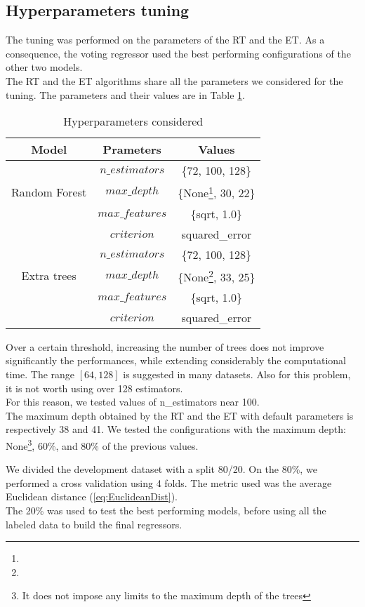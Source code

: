 \documentclass[conference]{IEEEtran}
\begin{document}
\subsection{Hyperparameters tuning}
The tuning was performed on the parameters of the RT and the ET. As a consequence, the voting regressor used the best performing configurations of the other two models. \\
The RT and the ET algorithms share all the parameters we considered for the tuning. The parameters and their values are in Table \ref{tab:tabHP}.
\begin{table}[h]
    \centering
    \caption{Hyperparameters considered}
    \label{tab:tabHP}
    \begin{tabular}{|c|c|c|}
        \hline
        \textbf{Model} & \textbf{Prameters} & \textbf{Values} \\
        \hline
        &$n\_estimators$&\{72, 100, 128\}\\
        Random Forest&$max\_depth$&\{None\footnote[1]{}, 30, 22\}\\
        &$max\_features$&\{sqrt, 1.0\}\\
        &$criterion$&squared\_error\\
        \hline
        &$n\_estimators$& \{72, 100, 128\} \\
        Extra trees&$max\_depth$&\{None\footnote[1]{}, 33, 25\}\\
        &$max\_features$&\{sqrt, 1.0\}\\
        &$criterion$&squared\_error\\
        \hline
    \end{tabular}
\end{table}

Over a certain threshold, increasing the number of trees does not improve significantly the performances, while extending considerably the computational time.  The range $[64, 128]$ is suggested in many datasets\cite{limitNumTrees}. Also for this problem, it is not worth using over 128 estimators. \\
For this reason, we tested values of n\_estimators near 100. \\

The maximum depth obtained by the RT and the ET with default parameters is respectively 38 and 41. We tested the configurations with the maximum depth: None\footnote[1]{It does not impose any limits to the maximum depth of the trees}, 60\%, and 80\% of the previous values. 

We divided the development dataset with a split 80/20. On the 80\%, we performed a cross validation using 4 folds. The metric used was the average Euclidean distance (\ref{eq:EuclideanDist}).\\
The 20\% was used to test the best performing models, before using all the labeled data to build the final regressors.
\end{document}
